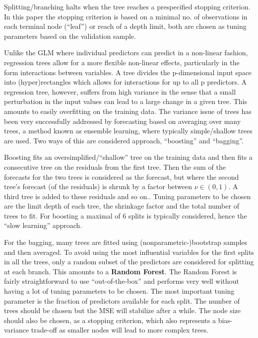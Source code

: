 \documentclass[]{article}
\begin{document}
Splitting/branching halts when the tree reaches a prespecified stopping
criterion. In this paper the stopping criterion is based on a minimal
no. of observations in each terminal node (``leaf'') or reach of a depth
limit, both are chosen as tuning parameters based on the validation
sample.

Unlike the GLM where individual predictors can predict in a non-linear
fashion, regression trees allow for a more flexible non-linear effects,
particularly in the form interactions between variables. A tree divides
the p-dimensional input space into (hyper)rectangles which allows for
interactions for up to all p predictors. A regression tree, however,
suffers from high variance in the sense that a small perturbation in the
input values can lead to a large change in a given tree. This amounts to
easily overfitting on the training data. The variance issue of trees has
been very successfully addressed by forecasting based on averaging over
many trees, a method known as ensemble learning, where typically
simple/shallow trees are used. Two ways of this are considered approach,
``boosting'' and ``bagging''.

Boosting fits an oversimplified/``shallow'' tree on the training data
and then fits a consecutive tree on the residuals from the first tree.
Then the sum of the forecasts for the two trees is considered as the
forecast, but where the second tree's forecast (of the residuals) is
shrunk by a factor between \(\nu \in (0,1)\). A third tree is added to
these residuals and so on.. Tuning parameters to be chosen are the limit
depth of each tree, the shrinkage factor and the total number of trees
to fit. For boosting a maximal of 6 splits is typically considered,
hence the ``slow learning'' approach.

For the bagging, many trees are fitted using (nonparametric-)bootstrap
samples and then averaged. To avoid using the most influential variables
for the first splits in all the trees, only a random subset of the
predictors are considered for splitting at each branch. This amounts to
a \textbf{Random Forest}. The Random Forest is fairly straightforward to
use ``out-of-the-box'' and performs very well without having a lot of
tuning parameters to be chosen. The most important tuning parameter is
the fraction of predictors available for each split. The number of trees
should be chosen but the MSE will stabilize after a while. The node size
should also be chosen, as a stopping criterion, which also represents a
bias-variance trade-off as smaller nodes will lead to more complex
trees.
\end{document}
